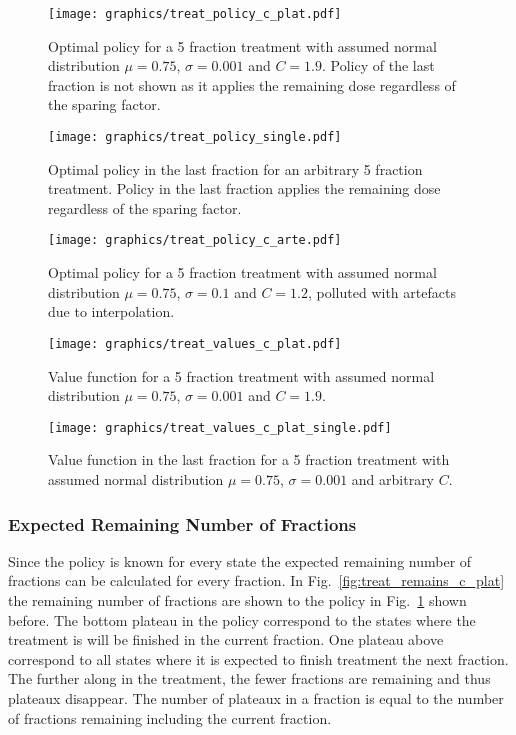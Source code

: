 \documentclass[\relativeRoot/ada.tex]{subfiles}
\begin{document}
\begin{figure}[!htb]
    \centering
    \texttt{[image: graphics/treat\_policy\_c\_plat.pdf]}
    \caption{Optimal policy for a 5 fraction treatment with assumed normal distribution $\mu=0.75$, $\sigma=0.001$ and $C=1.9$. Policy of the last fraction is not shown as it applies the remaining dose regardless of the sparing factor.}
    \label{fig:treat_policy_c_plat}
\end{figure}

\begin{figure}[!htb]
    \centering
    \texttt{[image: graphics/treat\_policy\_single.pdf]}
    \caption{Optimal policy in the last fraction for an arbitrary 5 fraction treatment. Policy in the last fraction applies the remaining dose regardless of the sparing factor.}
    \label{fig:treat_policy_single}
\end{figure}

\begin{figure}[!htb]
    \centering
    \texttt{[image: graphics/treat\_policy\_c\_arte.pdf]}
    \caption{Optimal policy for a 5 fraction treatment with assumed normal distribution $\mu=0.75$, $\sigma=0.1$ and $C=1.2$, polluted with artefacts due to interpolation.}
    \label{fig:treat_policy_c_arte}
\end{figure}

\begin{figure}[!htb]
    \centering
    \texttt{[image: graphics/treat\_values\_c\_plat.pdf]}
    \caption{Value function for a 5 fraction treatment with assumed normal distribution $\mu=0.75$, $\sigma=0.001$ and $C=1.9$.}
    \label{fig:treat_values_c_plat}
\end{figure}

\begin{figure}[!htb]
    \centering
    \texttt{[image: graphics/treat\_values\_c\_plat\_single.pdf]}
    \caption{Value function in the last fraction for a 5 fraction treatment with assumed normal distribution $\mu=0.75$, $\sigma=0.001$ and arbitrary $C$.}
    \label{fig:treat_values_c_plat_single}
\end{figure}

\subsubsection{Expected Remaining Number of Fractions}

Since the policy is known for every state the expected remaining number of fractions can be calculated for every fraction. In Fig.~\ref{fig:treat_remains_c_plat} the remaining number of fractions are shown to the policy in Fig.~\ref{fig:treat_policy_c_plat} shown before. The bottom plateau in the policy correspond to the states where the treatment is will be finished in the current fraction. One plateau above correspond to all states where it is expected to finish treatment the next fraction. The further along in the treatment, the fewer fractions are remaining and thus plateaux disappear. The number of plateaux in a fraction is equal to the number of fractions remaining including the current fraction.
\end{document}
